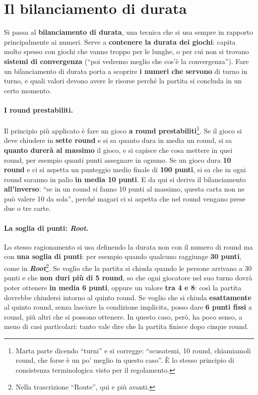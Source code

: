 \section{Il bilanciamento di durata}
\label{a14:sec:durata}

Si passa al \textbf{bilanciamento di durata}, una tecnica che si usa sempre in rapporto
principalmente ai numeri. Serve a \textbf{contenere la durata dei giochi}: capita molto
spesso con giochi che vanno troppo per le lunghe, o per cui non si trovano \textbf{sistemi di
convergenza} (``poi vedremo meglio che cos'è la convergenza''). Fare un bilanciamento di durata
porta a scoprire \textbf{i numeri che servono} di turno in turno, e quali valori devono avere le
risorse perché la partita si concluda in un certo momento.

\paragraph{I round prestabiliti.} Il principio più applicato è fare un gioco \textbf{a round
prestabiliti}\footnote{Marta parte dicendo ``turni'' e si corregge: ``scusatemi, 10 round,
chiamiamoli round, che forse è un po' meglio in questo caso''. È lo stesso principio di
consistenza terminologica visto per il regolamento.}. Se il gioco si deve chiudere in
\textbf{sette round} e si sa quanto dura in media un round, si sa \textbf{quanto durerà al
massimo} il gioco, e si capisce che cosa mettere in quei round, per esempio quanti punti
assegnare in ognuno. Se un gioco dura \textbf{10 round} e ci si aspetta un punteggio medio
finale di \textbf{100 punti}, si sa che in ogni round saranno in palio \textbf{in media 10
punti}. E da qui si deriva il bilanciamento \textbf{all'inverso}: ``se in un round si fanno 10
punti al massimo, questa carta non ne può valere 10 da sola'', perché magari ci si aspetta che
nel round vengano prese due o tre carte.

\paragraph{La soglia di punti: \emph{Root}.} Lo stesso ragionamento si usa definendo la durata
non con il numero di round ma con \textbf{una soglia di punti}: per esempio quando qualcuno
raggiunge \textbf{30 punti}, come in \textbf{\emph{Root}}\footnote{Nella trascrizione ``Route'',
qui e più avanti.}. Se voglio che la partita si chiuda quando le persone arrivano a 30 punti e
che \textbf{non duri più di 5 round}, so che ogni giocatore nel suo turno dovrà poter ottenere
\textbf{in media 6 punti}, oppure un valore \textbf{tra 4 e 8}: così la partita dovrebbe
chiudersi intorno al quinto round. Se voglio che si chiuda \textbf{esattamente} al quinto round,
senza lasciare la condizione implicita, posso dare \textbf{6 punti fissi} a round, più altri che
si possono ottenere. In questo caso, però, ha poco senso, a meno di casi particolari: tanto
vale dire che la partita finisce dopo cinque round.

